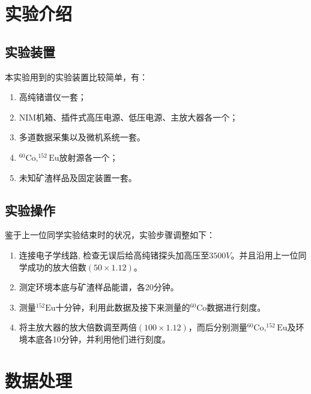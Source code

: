 \documentclass{article}
\begin{document}
\section{实验介绍}
\subsection{实验装置}
本实验用到的实验装置比较简单，有：
\begin{enumerate}
    \item 高纯锗谱仪一套；
    \item NIM机箱、插件式高压电源、低压电源、主放大器各一个；
    \item 多道数据采集以及微机系统一套。
    \item $^{60}\text{Co},^{152}\text{Eu}$放射源各一个；
    \item 未知矿渣样品及固定装置一套。
\end{enumerate}
\subsection{实验操作}
鉴于上一位同学实验结束时的状况，实验步骤调整如下：
\begin{enumerate}
    \item 连接电子学线路,
检查无误后给高纯锗探头加高压至$3500\si{V}$。并且沿用上一位同学成功的放大倍数$(50\times1.12)$。
    \item 测定环境本底与矿渣样品能谱，各20分钟。
    \item 测量$^{152}\text{Eu}$十分钟，利用此数据及接下来测量的$^{60}\text{Co}$数据进行刻度。
    \item 将主放大器的放大倍数调至两倍$(100\times 1.12)$，而后分别测量$^{60}\text{Co},^{152}\text{Eu}$及环境本底各10分钟，并利用他们进行刻度。
\end{enumerate}
\section{数据处理}
\end{document}
